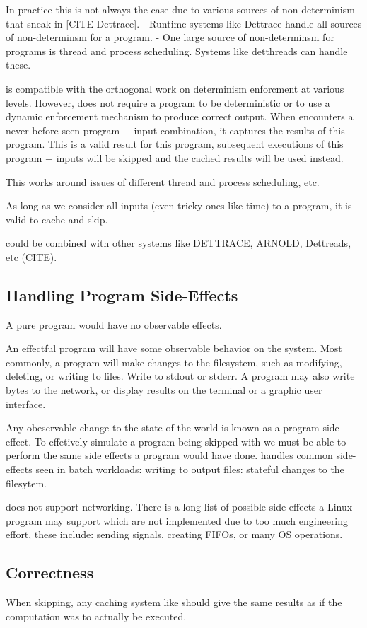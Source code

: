 In practice this is not always the case due to various sources of non-determinism that sneak in [CITE Dettrace].
- Runtime systems like Dettrace handle all sources of non-determinsm for a program.
- One large source of non-determinsm for programs is thread and process scheduling. Systems like detthreads
  can handle these.


\pc is compatible with the orthogonal work on determinism enforcment at various levels. However,
\pc does not require a program to be deterministic or to use a dynamic enforcement mechanism to
produce correct output. When \pc encounters a never before seen program + input combination, it
captures the results of this program. This is a valid result for this program, subsequent executions of this program + inputs will be skipped and the cached results will be used instead.

This works around issues of different thread and process scheduling, etc.

As long as we consider all inputs (even tricky ones like time) to a program, it is valid to cache and
skip.

\pc could be combined with other systems like DETTRACE, ARNOLD, Dettreads, etc (CITE).

\subsection{Handling Program Side-Effects}
A pure program would have no observable effects.

An effectful program will have some observable behavior on the system. Most commonly, a program will make
changes to the filesystem, such as modifying, deleting, or writing to files. Write to stdout or stderr.
A program may also write bytes to the network, or display results on the terminal or a graphic user
interface.

Any obeservable change to the state of the world is known as a program side effect. To effetively simulate
a program being skipped with \pc we must be able to perform the same side effects a program would have done. \pc handles common side-effects seen in batch workloads: writing to output files: stateful changes
to the filesytem.

\pc does not support networking. There is a long list of possible side effects a Linux program may
support which are not implemented due to too much engineering effort, these include: sending signals,
creating FIFOs, or many OS operations.

\subsection{Correctness}
When skipping, any caching system like \pc should give the same results as if the computation was to actually be executed.

